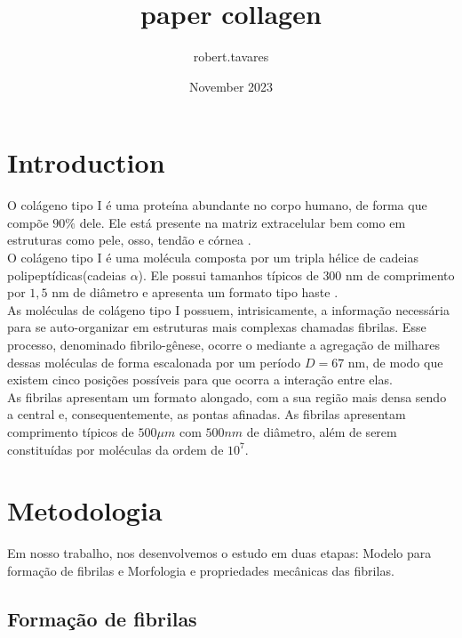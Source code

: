 \documentclass{article}
\title{paper collagen}
\author{robert.tavares}
\date{November 2023}
\begin{document}
\maketitle

\section{Introduction}

O colágeno tipo I é uma proteína abundante no corpo humano, de forma que compõe $90\%$ dele. Ele está presente na matriz extracelular bem como em estruturas como pele, osso, tendão e córnea \cite{RicoLlanos2021, Silver2018}.
\\

O colágeno tipo I é uma molécula composta por um tripla hélice de cadeias polipeptídicas(cadeias $\alpha$). Ele possui tamanhos típicos de $300$ nm de comprimento por $1,5$ nm de diâmetro e apresenta um formato tipo haste \cite{Gelse2003,Silver2018}. 
\\

As moléculas de colágeno tipo I possuem, intrisicamente, a informação necessária para se auto-organizar em estruturas mais complexas chamadas fibrilas. Esse processo, denominado fibrilo-gênese, ocorre o mediante a agregação de milhares dessas moléculas de forma escalonada por um período $D= 67$ nm, de modo que existem cinco posições possíveis para que ocorra a interação entre elas\cite{Zhu2018, KADLER1996}.  
\\

As fibrilas apresentam um formato alongado, com a sua região mais densa sendo a central e, consequentemente, as pontas afinadas\cite{Charvolin2019, KADLER1996}. As fibrilas apresentam comprimento típicos de $500 \mu m$ com $500 nm$ de diâmetro, além de serem constituídas por moléculas da ordem de $10^{7}$\cite{Parry1984}. 
\\


\section{Metodologia}

    Em nosso trabalho, nos desenvolvemos o estudo em duas etapas: Modelo para formação de fibrilas e Morfologia e 
    propriedades mecânicas das fibrilas.

    \subsection{Formação de fibrilas}
\end{document}
